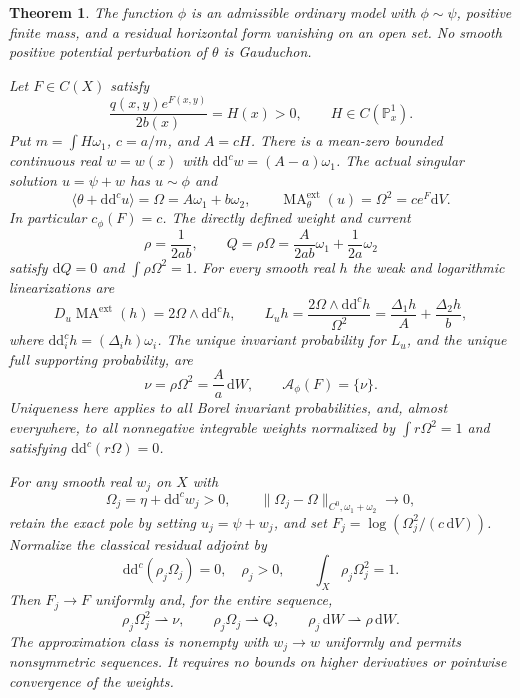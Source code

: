 \documentclass[11pt]{article}
\newtheorem{theorem}{Theorem}[section]
\newcommand{\ddc}{\mathrm{d}\mathrm{d}^c}
\newcommand{\MA}{\operatorname{MA}}
\newcommand{\suppset}{\mathcal A}
\begin{document}
\begin{theorem}\label{thm:main}
The function $\phi$ is an admissible ordinary model with $\phi\sim\psi$,
positive finite mass, and a residual horizontal form vanishing on an open
set. No smooth positive potential perturbation of $\theta$ is Gauduchon.

Let $F\in C(X)$ satisfy
\begin{equation}\label{eq:density}
 \frac{q(x,y)e^{F(x,y)}}{2b(x)}=H(x)>0,
 \qquad H\in C(\mathbb P^1_x).
\end{equation}
Put $m=\int H\omega_1$, $c=a/m$, and $A=cH$. There is a mean-zero
bounded continuous real $w=w(x)$ with $\ddc w=(A-a)\omega_1$.
The actual singular solution $u=\psi+w$ has $u\sim\phi$ and
\[
 \langle\theta+\ddc u\rangle=\Omega=A\omega_1+b\omega_2,
 \qquad\MA^{\mathrm{ext}}_\theta(u)=\Omega^2=c e^F\mathrm{d}V.
\]
In particular $c_\phi(F)=c$. The directly defined weight and current
\begin{equation}\label{eq:weight}
 \rho=\frac1{2ab},\qquad Q=\rho\Omega
 =\frac{A}{2ab}\omega_1+\frac1{2a}\omega_2
\end{equation}
satisfy $\mathrm{d}Q=0$ and $\int\rho\Omega^2=1$.
For every smooth real $h$ the weak and logarithmic linearizations are
\[
 D_u\MA^{\mathrm{ext}}(h)=2\Omega\wedge\ddc h,
 \qquad L_uh=\frac{2\Omega\wedge\ddc h}{\Omega^2}
 =\frac{\Delta_1h}{A}+\frac{\Delta_2h}{b},
\]
where $\ddc_i h=(\Delta_i h)\omega_i$. The unique invariant probability for $L_u$,
and the unique full supporting probability, are
\begin{equation}\label{eq:nu}
 \nu=\rho\Omega^2=\frac A a\,\mathrm{d}W,
 \qquad \suppset_\phi(F)=\{\nu\}.
\end{equation}
Uniqueness here applies to all Borel invariant probabilities, and, almost everywhere, to all
nonnegative integrable weights normalized by $\int r\Omega^2=1$ and
satisfying $\ddc(r\Omega)=0$.

For any smooth real $w_j$ on $X$ with
\begin{equation}\label{eq:approx}
 \Omega_j=\eta+\ddc w_j>0,
 \qquad\|\Omega_j-\Omega\|_{C^0,\omega_1+\omega_2}\longrightarrow0,
\end{equation}
retain the exact pole by setting $u_j=\psi+w_j$, and set
$F_j=\log(\Omega_j^2/(c\,\mathrm{d}V))$. Normalize the classical residual
adjoint by
\[
 \ddc(\rho_j\Omega_j)=0,\quad\rho_j>0,
 \qquad\int_X\rho_j\Omega_j^2=1.
\]
Then $F_j\to F$ uniformly and, for the entire sequence,
\begin{equation}\label{eq:limits}
 \rho_j\Omega_j^2\rightharpoonup\nu,\qquad
 \rho_j\Omega_j\rightharpoonup Q,\qquad
 \rho_j\,\mathrm{d}W\rightharpoonup\rho\,\mathrm{d}W.
\end{equation}
The approximation class is nonempty with $w_j\to w$ uniformly and permits
nonsymmetric sequences. It requires no bounds on higher derivatives or
pointwise convergence of the weights.
\end{theorem}
\end{document}
